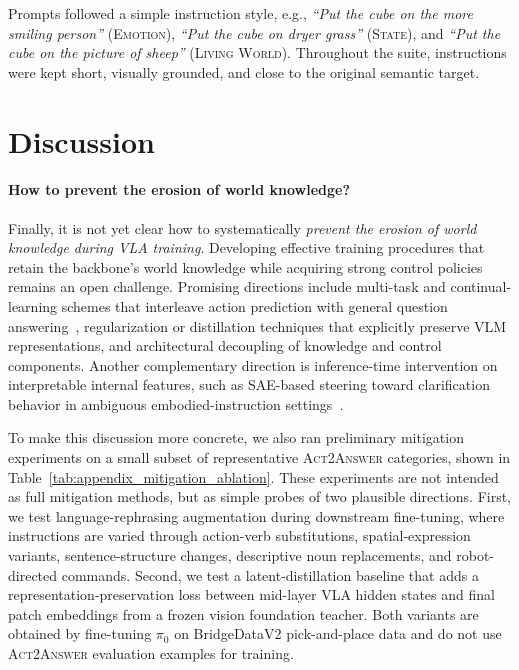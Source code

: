 \documentclass{llmxive}
\begin{document}
Prompts followed a simple instruction style, e.g., \textit{``Put the cube on the more smiling person''} (\textsc{Emotion}), \textit{``Put the cube on dryer grass''} (\textsc{State}), and \textit{``Put the cube on the picture of sheep''} (\textsc{Living World}). Throughout the suite, instructions were kept short, visually grounded, and close to the original semantic target.

\section{Discussion}

\paragraph{How to prevent the erosion of world knowledge?}
Finally, it is not yet clear how to systematically \emph{prevent the erosion of world knowledge during VLA training}. 
Developing effective training procedures that retain the backbone’s world knowledge while acquiring strong control policies remains an open challenge.
Promising directions include multi-task and continual-learning schemes that interleave action prediction with general question answering~\cite{zitkovich2023rt, amin2025pi, ivanova-etal-2025-ambik}, regularization or distillation techniques that explicitly preserve VLM representations, and architectural decoupling of knowledge and control components. Another complementary direction is inference-time intervention on interpretable internal features, such as SAE-based steering toward clarification behavior in ambiguous embodied-instruction settings~\citep{petrova2026steering}.

To make this discussion more concrete, we also ran preliminary mitigation experiments on a small subset of representative \textsc{Act2Answer} categories, shown in Table~\ref{tab:appendix_mitigation_ablation}.
These experiments are not intended as full mitigation methods, but as simple probes of two plausible directions.
First, we test language-rephrasing augmentation during downstream fine-tuning, where instructions are varied through action-verb substitutions, spatial-expression variants, sentence-structure changes, descriptive noun replacements, and robot-directed commands.
Second, we test a latent-distillation baseline that adds a representation-preservation loss between mid-layer VLA hidden states and final patch embeddings from a frozen vision foundation teacher.
Both variants are obtained by fine-tuning $\pi_0$ on BridgeDataV2 pick-and-place data and do not use \textsc{Act2Answer} evaluation examples for training.
\end{document}
